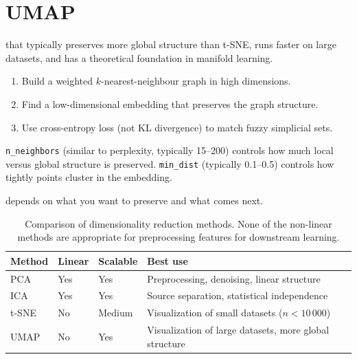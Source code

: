 \section{UMAP}


 that typically preserves more global structure than t-SNE, runs faster on large datasets, and has a theoretical foundation in manifold learning.

\begin{enumerate}
    \item Build a weighted $k$-nearest-neighbour graph in high dimensions.
    \item Find a low-dimensional embedding that preserves the graph structure.
    \item Use cross-entropy loss (not KL divergence) to match fuzzy simplicial sets.
\end{enumerate}

 \texttt{n\_neighbors} (similar to perplexity, typically 15--200) controls how much local versus global structure is preserved.
\texttt{min\_dist} (typically 0.1--0.5) controls how tightly points cluster in the embedding.

\vspace{2.5em}

 depends on what you want to preserve and what comes next.

\begin{table}[ht]
\centering
\begin{tabular}{p{}p{}p{}p{}}
    \toprule
    \textbf{Method} & \textbf{Linear} & \textbf{Scalable} & \textbf{Best use} \\
    \midrule
    PCA   & Yes & Yes    & Preprocessing, denoising, linear structure \\
    ICA   & Yes & Yes    & Source separation, statistical independence \\
    t-SNE & No  & Medium & Visualization of small datasets ($n < 10\,000$) \\
    UMAP  & No  & Yes    & Visualization of large datasets, more global structure \\
    \bottomrule
\end{tabular}
\vspace{2em}
\caption{Comparison of dimensionality reduction methods. None of the non-linear methods are appropriate for preprocessing features for downstream learning.}
\label{tab:dim_reduction_methods}
\end{table}


